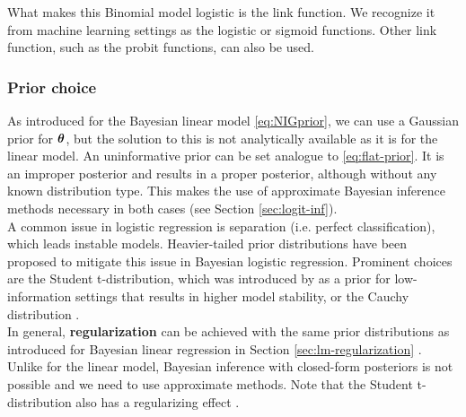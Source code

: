What makes this Binomial model logistic is the link function. We recognize it from machine learning settings as the logistic or sigmoid functions. Other link function, such as the probit functions, can also be used.


\subsubsection*{Prior choice}

As introduced for the Bayesian linear model \eqref{eq:NIGprior}, we can use a Gaussian prior for $\bm{\theta}$, but the solution to this is not analytically available as it is for the linear model.
An uninformative prior can be set analogue to \eqref{eq:flat-prior}.
It is an improper posterior and results in a proper posterior, although without any known distribution type.
This makes the use of approximate Bayesian inference methods necessary in both cases (see Section \ref{sec:logit-inf}).\\

A common issue in logistic regression is separation (i.e. perfect classification), which leads instable models.
Heavier-tailed prior distributions have been proposed to mitigate this issue in Bayesian logistic regression.
Prominent choices are the Student t-distribution, which was introduced by \citet{gelman_weakly_2008} as a prior for low-information settings that results in higher model stability, or the Cauchy distribution . \\

In general, \textbf{regularization} can be achieved with the same prior distributions as introduced for Bayesian linear regression in Section \ref{sec:lm-regularization} .
Unlike for the linear model, Bayesian inference with closed-form posteriors is not possible and we need to use approximate methods.
Note that the Student t-distribution also has a regularizing effect \citep{gelman_weakly_2008}.


